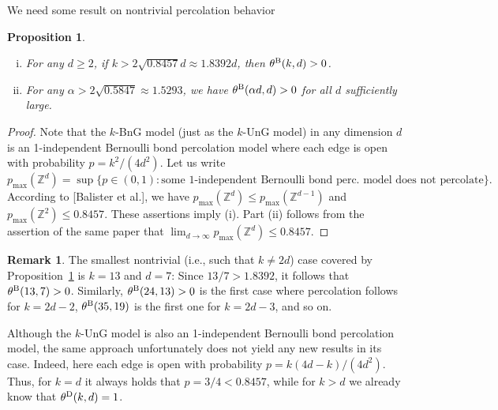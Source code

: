 \documentclass{article}
\newtheorem{prop}[theorem]{Proposition}
\theoremstyle{definition}
\newtheorem{remark}[theorem]{Remark}
\newcommand{\1}{\mathbbm{1}}
\newcommand{\0}{\mathbf{o}}
\newcommand{\Z}{\mathbb{Z}}
\begin{document}
We need some result on nontrivial percolation behavior
\begin{prop}\label{prop-1indep}
\begin{enumerate}[(i)]
\item For any $d \geq 2$, if $k>2\sqrt{0.8457}d \approx 1.8392d$, then $\theta^{\rm B}(k,d)>0$.
\item For any $\alpha > 2 \sqrt{0.5847} \approx 1.5293$, we have $\theta^{\rm B}(\alpha d, d)>0$ for all $d$ sufficiently large.
\end{enumerate}
\end{prop}
\begin{proof}
Note that the $k$-BnG model (just as the $k$-UnG model) in any dimension $d$ is an 1-independent Bernoulli bond percolation model where each edge is open with probability $p=k^2/(4d^2)$. Let us write 
\[ p_{\max}(\Z^d)= \sup \{ p \in (0,1) \colon \text{some 1-independent Bernoulli bond perc.\ model does not percolate} \}. \]
According to [Balister et al.], we have $p_{\max}(\Z^d) \leq p_{\max}(\Z^{d-1})$ and $p_{\max}(\Z^2) \leq 0.8457$. These assertions imply (i). Part (ii) follows from the assertion of the same paper that $\lim_{d\to\infty} p_{\max}(\Z^d) \leq 0.8457$. 
\end{proof}
\begin{remark}
The smallest nontrivial (i.e., such that $k \neq 2d$) case covered by Proposition~\ref{prop-1indep} is $k=13$ and $d=7$: Since $13/7 >1.8392$, it follows that $\theta^{\rm B}(13,7)>0$. Similarly, $\theta^{\rm B}(24,13)>0$ is the first case where percolation follows for $k=2d-2$, $\theta^{\rm B}(35,19)$ is the first one for $k=2d-3$, and so on.

Although the $k$-UnG model is also an 1-independent Bernoulli bond percolation model, the same approach unfortunately does not yield any new results in its case. Indeed, here each edge is open with probability $p=k(4d-k)/(4d^2)$. Thus, for $k=d$ it always holds that $p=3/4<0.8457$, while for $k>d$ we already know that $\theta^{\rm D}(k,d)=1$. 
\end{remark}

\end{document}
